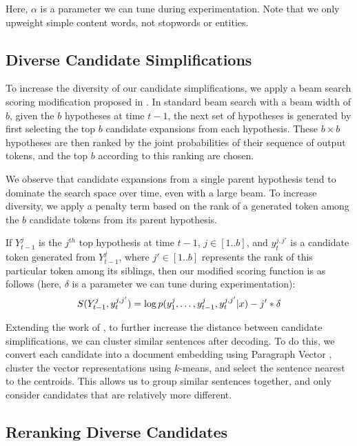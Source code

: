 \documentclass[11pt,a4paper]{article}
\begin{document}
Here, $\alpha$ is a parameter we can tune during experimentation.
Note that we only upweight simple content words, not stopwords or entities.

\subsection{Diverse Candidate Simplifications} \label{diverse}

To increase the diversity of our candidate simplifications, we apply a beam search scoring modification proposed in . In standard beam search with a beam width of $b$, given the $b$ hypotheses at time $t-1$, the next set of hypotheses is generated by first selecting the top $b$ candidate expansions from each hypothesis. These $b\times b$ hypotheses are then ranked by the joint probabilities of their sequence of output tokens, and the top $b$ according to this ranking are chosen.

We observe that candidate expansions from a single parent hypothesis tend to dominate the search space over time, even with a large beam. To increase diversity, we apply a penalty term based on the rank of a generated token among the $b$ candidate tokens from its parent hypothesis.

If $Y^j_{t-1}$ is the $j^{th}$ top hypothesis at time $t-1$, $j\in[1..b]$, and $y_t^{j,j'}$ is a candidate token generated from $Y^j_{t-1}$, where $j'\in[1..b]$ represents the rank of this particular token among its siblings, then our modified scoring function is as follows (here, $\delta$ is a parameter we can tune during experimentation):
\begin{equation}
\small
S(Y_{t-1}^j,y_t^{j,j'})=\log{p(y_1^j,\dots,y_{t-1}^j,y_t^{j,j'}|x)}-j'*\delta
\end{equation}

Extending the work of , to further increase the distance between candidate simplifications, we can cluster similar sentences after decoding. To do this, we convert each candidate into a document embedding using Paragraph Vector \cite{le2014distributed}, cluster the vector representations using $k$-means, and select the sentence nearest to the centroids. This allows us to group similar sentences together, and only consider candidates that are relatively more different.

\subsection{Reranking Diverse Candidates}
\end{document}
